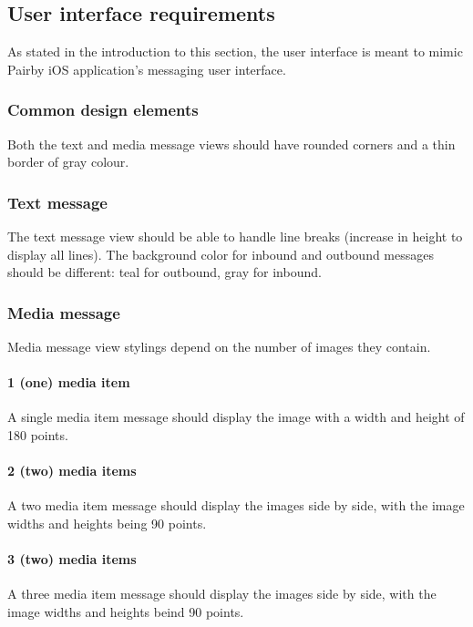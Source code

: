 \documentclass[a4paper,12pt]{article}
\begin{document}
\subsection{User interface requirements}
As stated in the introduction to this section, the user interface is meant to mimic Pairby iOS application's messaging
user interface.

\subsubsection*{Common design elements}
Both the text and media message views should have rounded corners and a thin border of gray colour.

\subsubsection{Text message}
The text message view should be able to handle line breaks (increase in height to display all lines). The background
color for inbound and outbound messages should be different: teal for outbound, gray for inbound.

\subsubsection{Media message}
Media message view stylings depend on the number of images they contain.

\paragraph{1 (one) media item}
A single media item message should display the image with a width and height of 180 points.

\paragraph{2 (two) media items}
A two media item message should display the images side by side, with the image widths and heights being 90 points.

\paragraph{3 (two) media items}
A three media item message should display the images side by side, with the image widths and heights beind 90 points.

\newpage
{}
{}
\listoffigures

\newpage
{}
{}


		
\end{document}
